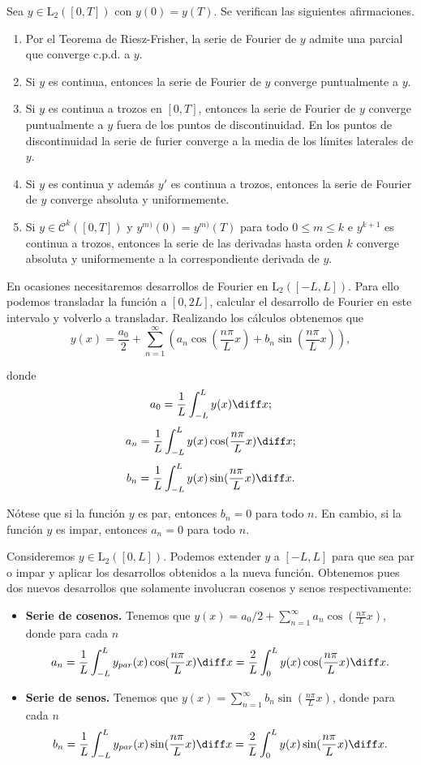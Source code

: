 \documentclass{article}
\begin{document}
\begin{theorem}
  \label{thm:fourier:convergencia}
  Sea $y \in \mathrm{L}_2([0,T])$ con $y(0) = y(T)$. Se verifican las siguientes afirmaciones.
  \begin{enumerate}
  \item Por el Teorema de Riesz-Frisher, la serie de Fourier de $y$ admite una parcial que converge
    c.p.d. a $y$.
  \item Si $y$ es continua, entonces la serie de Fourier de $y$ converge puntualmente a $y$.
  \item Si $y$ es continua a trozos en $[0,T]$, entonces la serie de Fourier de $y$ converge
    puntualmente a $y$ fuera de los puntos de discontinuidad. En los puntos de discontinuidad la
    serie de furier converge a la media de los límites laterales de $y$.
  \item Si $y$ es continua y además $y'$ es continua a trozos, entonces la serie de Fourier de $y$
    converge absoluta y uniformemente.
  \item Si $y \in \mathcal{C}^{k}([0,T])$ y $y^{m)}(0) = y^{m)}(T)$ para todo $0 \le m \le k$ e
    $y^{k+1}$ es continua a trozos, entonces la serie de las derivadas hasta orden $k$ converge
    absoluta y uniformemente a la correspondiente derivada de $y$.
  \end{enumerate}
\end{theorem}

En ocasiones necesitaremos desarrollos de Fourier en $\mathrm{L}_2([-L,L])$. Para ello podemos
transladar la función a $[0,2L]$, calcular el desarrollo de Fourier en este intervalo y volverlo a
transladar. Realizando los cálculos obtenemos que
\[ y(x) = \frac{a_0}{2} + \sum\limits_{n = 1}^{\infty} \left(a_n \cos(\frac{n \pi}{L} x) + b_n
    \sin(\frac{n \pi}{L} x)\right), \]

donde
\[ a_0 = \frac{1}{L} \int_{-L}^L y(x) \diff x; \]
\[ a_n = \frac{1}{L} \int_{-L}^L y(x) \cos(\frac{n \pi}{L}x) \diff x; \]
\[ b_n = \frac{1}{L} \int_{-L}^L y(x) \sin(\frac{n \pi}{L}x) \diff x. \]

Nótese que si la función $y$ es par, entonces $b_n = 0$ para todo $n$. En cambio, si la función $y$
es impar, entonces $a_n = 0$ para todo $n$.

Consideremos $y \in \mathrm{L}_2([0,L])$. Podemos extender $y$ a $[-L, L]$ para que sea par o impar
y aplicar los desarrollos obtenidos a la nueva función. Obtenemos pues dos nuevos desarrollos que
solamente involucran cosenos y senos respectivamente:
\begin{itemize}
\item \textbf{Serie de cosenos.} Tenemos que
  $y(x) = a_0 / 2 + \sum_{n = 1}^{\infty} a_n \cos(\frac{n \pi}{L} x)$, donde para cada $n$
  \[ a_n = \frac{1}{L} \int_{-L}^L y_{par}(x) \cos(\frac{n \pi}{L}x) \diff x = \frac{2}{L}
    \int_{0}^L y(x) \cos(\frac{n \pi}{L}x) \diff x.\]
\item \textbf{Serie de senos.} Tenemos que
  $y(x) = \sum_{n = 1}^{\infty} b_n \sin(\frac{n \pi}{L} x)$, donde para cada $n$
  \[ b_n = \frac{1}{L} \int_{-L}^L y_{par}(x) \sin(\frac{n \pi}{L}x) \diff x = \frac{2}{L}
    \int_{0}^L y(x) \sin(\frac{n \pi}{L}x) \diff x.\]
\end{itemize}
\end{document}
